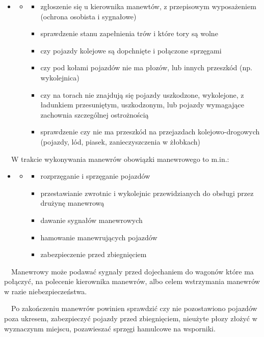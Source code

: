 \begin{itemize}
\item \begin{itemize}
\item \begin{itemize}
\item zgłoszenie się u kierownika manewtów, z przepisowym wyposażeniem (ochrona osobista i sygnałowe)
\item sprawdzenie stanu zapełnienia trów i które tory są wolne
\item czy pojazdy kolejowe są dopchnięte i połączone sprzęgami
\item czy pod kołami pojazdów nie ma płozów, lub innych przeszkód (np. wykolejnica)
\item czy na torach nie znajdują się pojazdy uszkodzone, wykolejone, z ładunkiem przesuniętym, uszkodzonym, lub pojazdy
wymagające zachownia szczególnej ostrożnością
\item sprawdzenie czy nie ma przeszkód na przejazdach kolejowo-drogowych (pojazdy, lód, piasek, zanieczyszczenia w
żłobkach)
\end{itemize}
\end{itemize}
\end{itemize}
\ \ W trakcie wykonywania manewrów obowiązki manewrowego to m.in.:

\begin{itemize}
\item \begin{itemize}
\item \begin{itemize}
\item rozprzęganie i sprzęganie pojazdów
\item przestawianie zwrotnic i wykolejnic przewidzianych do obsługi przez drużynę manewrową
\item dawanie sygnałów manewrowych
\item hamowanie manewrujących pojazdów
\item zabezpieczenie przed zbiegnięciem
\end{itemize}
\end{itemize}
\end{itemize}
\ \ Manewrowy może podawać sygnały przed dojechaniem do wagonów które ma połączyć, na polecenie kierownika manewrów,
albo celem wstrzymania manewrów w razie niebezpieczeństwa.

\ \ Po zakończeniu manewrów powinien sprawdzić czy nie pozostawiono pojazdów poza ukresem, zabezpieczyć pojazdy przed
zbiegnięciem, nieużyte płozy złożyć w wyznaczynm miejscu, pozawieszać sprzęgi hamulcowe na wsporniki.

